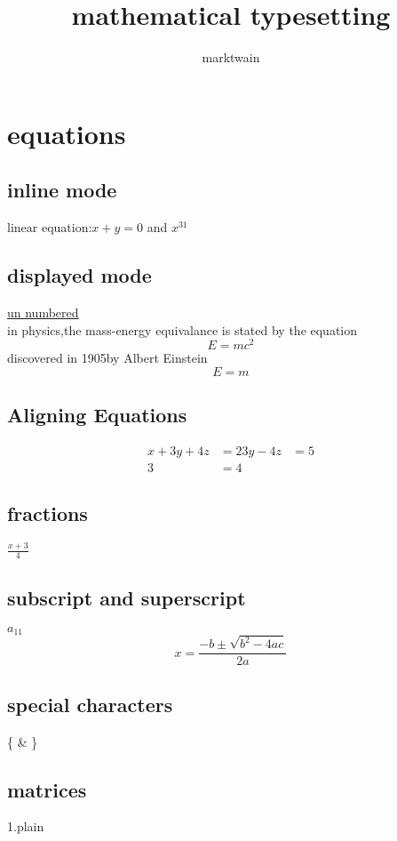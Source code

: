 \documentclass[12pt]{book}
\begin{document}
\title{mathematical typesetting}
\author{marktwain}
\maketitle
\chapter{equations}
\section{inline mode}
linear equation:$ x+y=0 $ and $x^{31} $
\section{displayed mode}
\underline{un numbered}\\
in physics,the mass-energy equivalance is stated by the equation $$ E=mc^2 $$ discovered in 1905by Albert Einstein\\
\begin{equation*}
E=m
\end{equation*}

\section{Aligning Equations}
\begin{align*}
x + 3y + 4z &=2 
 3y - 4z &= 5 \\
 3 &= 4
 \end{align*}
 
\section{fractions}
$ \frac{x+3}{4} $

 \section{subscript and superscript}
$ a_{11} $
$$ x=\frac{-b \pm  \sqrt{b^2-4ac}} {2a}$$

\section{special characters}
\{ \& \}  
 
\section{matrices}
1.plain\\
\end{document}
